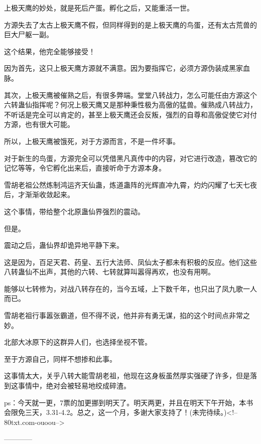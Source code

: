 \begin{this_body}
上极天鹰的妙处，就是死后产蛋。孵化之后，又能重活一世。

方源失去了太古上极天鹰不假，但同样得到的是上极天鹰的鸟蛋，还有太古荒兽的巨大尸躯一副。

这个结果，他完全能够接受！

因为首先，这只上极天鹰方源就不满意。因为要指挥它，必须方源伪装成黑家血脉。

其次，上极天鹰被催熟之后，有很多弊端。堂堂八转战力，怎么可能任由方源这个六转蛊仙指挥呢？何况上极天鹰又是那种秉性极为高傲的猛兽。催熟成八转战力，不听话是完全可以肯定的，甚至上极天鹰还会反叛，强烈的自尊和高傲促使它对付方源，也有很大可能。

所以，上极天鹰被饿死，对于方源而言，不是一件坏事。

对于新生的鸟蛋，方源完全可以凭借黑凡真传中的内容，对它进行改造，篡改它的记忆等等，令它孵化出来后，直接听命于方源本身。

雪胡老祖公然炼制鸿运齐天仙蛊，炼道蛊阵的光辉直冲九霄，灼灼闪耀了七天七夜后，才渐渐收敛起来。

这个事情，带给整个北原蛊仙界强烈的震动。

但是。

震动之后，蛊仙界却诡异地平静下来。

这是因为，百足天君、药皇、五行大法师、凤仙太子都未有积极的反应。他们这些八转蛊仙不出声，其他的六转、七转就算叫嚣得再欢，也没有用啊。

能够以七转修为，对战八转存在的，当今五域，上下数千年，也只出了凤九歌一人而已。

雪胡老祖行事嚣张霸道，但不得不说，他并非有勇无谋，掐的这个时间点非常之妙。

北部大冰原下的这群异人们，也选择坐视不管。

至于方源自己，同样不想掺和此事。

这事情太大，关乎八转大能雪胡老祖，他现在这身板虽然厚实强硬了许多，但是落到这事情中，绝对会被轻易地绞成碎渣。

ps：今天就一更，7票的加更挪到明天了。明天两更，并且在明天下午开始，本书会限免三天，3.31-4.2。总之，这一个月，多谢大家支持了！(未完待续。)<!--80txt.com-ouoou-->

------------

\end{this_body}

